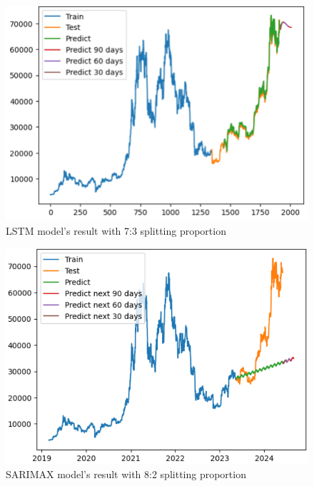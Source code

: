 \documentclass{ieeeojies}
\begin{document}
\begin{figure}[H]
	\centering
	\begin{minipage}{0.8\linewidth}
		\centering
		\includegraphics[width=\linewidth]{bibliography/Images/LSTM_BTC_73.PNG}
		\caption{LSTM model's result with 7:3 splitting proportion}
	\end{minipage}
\end{figure}
\begin{figure}[H]
	\centering
	\begin{minipage}{0.8\linewidth}
		\centering
		\includegraphics[width=\linewidth]{bibliography/Images/SARIMAX_BTC_82.PNG}
		\caption{SARIMAX model's result with 8:2 splitting proportion}
	\end{minipage}
\end{figure}
\end{document}
